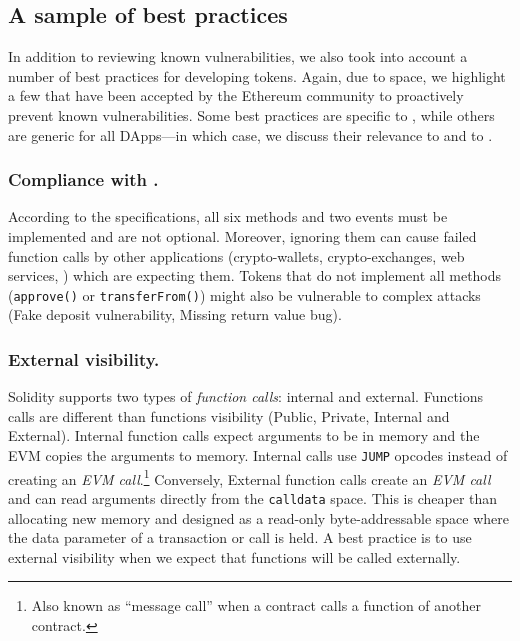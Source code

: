 
\subsection{A sample of best practices}\label{section:bp}

In addition to reviewing known vulnerabilities, we also took into account a number of best practices for developing \erc tokens. Again, due to space, we highlight a few that have been accepted by the Ethereum community to proactively prevent known vulnerabilities\cite{TokenBP}. Some best practices are specific to \erc, while others are generic for all DApps---in which case, we discuss their relevance to \erc and to \sys.

\subsubsection{Compliance with \erc.}

According to the \erc specifications, all six methods and two events must be implemented and are not optional. Moreover, ignoring them can cause failed function calls by other applications (\ie crypto-wallets, crypto-exchanges, web services, \etc) which are expecting them. Tokens that do not implement all methods (\eg \texttt{approve()} or \texttt{transferFrom()}) might also be vulnerable to complex attacks (\eg Fake deposit vulnerability\cite{DEPOSafe}, Missing return value bug\cite{ErcBug}).

\subsubsection{External visibility.}\label{subsec:external}

Solidity supports two types of \textit{function calls}: internal and external\cite{SolidityDoc}. { \blue Functions calls are different than functions visibility (\ie Public, Private, Internal and External).} Internal function calls expect arguments to be in memory and the EVM copies the arguments to memory. Internal calls use \texttt{JUMP} opcodes instead of creating an \textit{EVM call}.\footnote{Also known as ``message call'' when a contract calls a function of another contract.} Conversely, External function calls create an \textit{EVM call} and can read arguments directly from the \texttt{calldata} space. This is cheaper than allocating new memory and designed as a read-only byte-addressable space where the data parameter of a transaction or call is held\cite{EthInDepth}. A best practice is to use external visibility when we expect that functions will be called externally.

